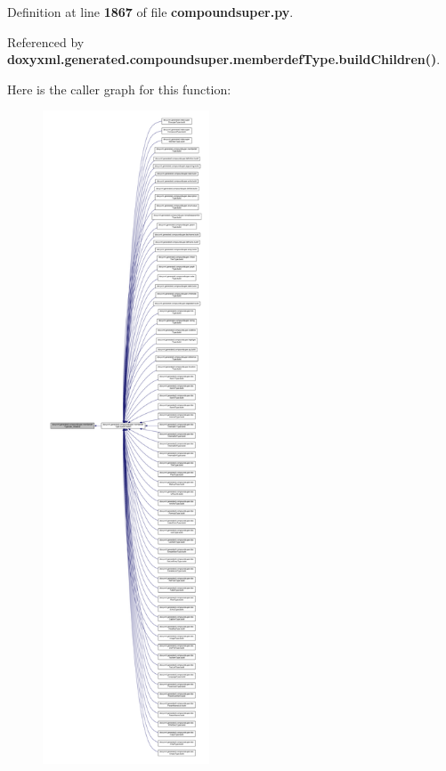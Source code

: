 Definition at line {\bf 1867} of file {\bf compoundsuper.\+py}.



Referenced by {\bf doxyxml.\+generated.\+compoundsuper.\+memberdef\+Type.\+build\+Children()}.



Here is the caller graph for this function\+:
\nopagebreak
\begin{figure}[H]
\begin{center}
\leavevmode
\includegraphics[height=550pt]{de/d3a/classdoxyxml_1_1generated_1_1compoundsuper_1_1memberdefType_ac5e971b3fedddfeb2fcf9412048b7ba3_icgraph}
\end{center}
\end{figure}


